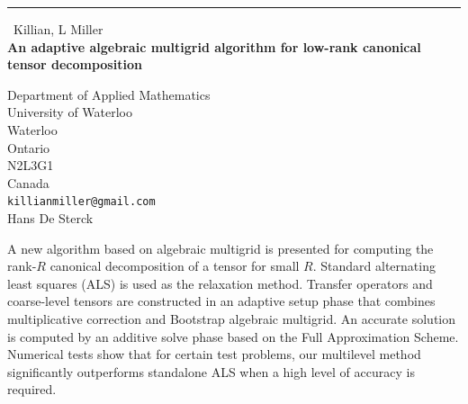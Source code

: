 \documentclass{report}
\begin{document}
\begin{center}
\rule{6in}{1pt} \
{\large Killian, L Miller \\
{\bf An adaptive algebraic multigrid algorithm for low-rank canonical tensor decomposition}}

Department of Applied Mathematics \\ University of Waterloo \\ Waterloo \\ Ontario \\ N2L3G1 \\ Canada
\\
{\tt killianmiller@gmail.com}\\
Hans De Sterck\end{center}

A new algorithm based on algebraic multigrid is presented for computing
the rank-$R$ canonical decomposition of a tensor for small $R$. Standard
alternating least squares (ALS) is used as the relaxation method.
Transfer operators and coarse-level tensors are constructed in an
adaptive setup phase that combines multiplicative correction and
Bootstrap algebraic multigrid. An accurate solution is computed by an
additive solve phase based on the Full Approximation Scheme. Numerical
tests show that for certain test problems, our multilevel method
significantly outperforms standalone ALS when a high level of accuracy is
required.
\end{document}
